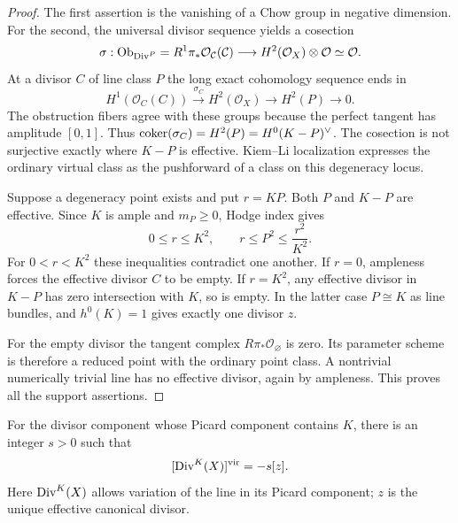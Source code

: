 \begin{proof}
The first assertion is the vanishing of a Chow group in
negative dimension.  For the second, the universal divisor
sequence yields a cosection
\begin{equation}\label{fix:cosection}
 \sigma:\operatorname{Ob}_{\operatorname{Div}^P}
 =R^1\pi_*\mathcal O_{\mathcal C}(\mathcal C)
       \longrightarrow H^2(\mathcal O_X)\otimes\mathcal O
       \simeq\mathcal O.
\end{equation}
At a divisor \(C\) of line class \(P\) the long exact
cohomology sequence ends in
\[
 H^1(\mathcal O_C(C))\xrightarrow{\sigma_C}H^2(\mathcal O_X)
       \longrightarrow H^2(P)\longrightarrow0.
\]
The obstruction fibers agree with these groups because the
perfect tangent has amplitude \([0,1]\).  Thus
\(\operatorname{coker}(\sigma_C)=H^2(P)=H^0(K-P)^\vee\).
The cosection is not surjective exactly where \(K-P\) is
effective.  Kiem--Li localization
\cite[Theorem~1.1]{KiemLi} expresses the ordinary virtual
class as the pushforward of a class on this degeneracy locus.

Suppose a degeneracy point exists and put \(r=KP\).
Both \(P\) and \(K-P\) are effective.  Since \(K\) is ample
and \(m_P\ge0\), Hodge index gives
\[
 0\le r\le K^2,\qquad
 r\le P^2\le\frac{r^2}{K^2}.
\]
For \(0<r<K^2\) these inequalities contradict one another.
If \(r=0\), ampleness forces the effective divisor \(C\)
to be empty.  If \(r=K^2\), any effective divisor in
\(K-P\) has zero intersection with \(K\), so is empty.
In the latter case \(P\cong K\) as line bundles, and
\(h^0(K)=1\) gives exactly one divisor \(z\).

For the empty divisor the tangent complex
\(R\pi_*\mathcal O_\varnothing\) is zero.
Its parameter scheme is therefore a reduced point with
the ordinary point class.  A nontrivial numerically
trivial line has no effective divisor, again by ampleness.
This proves all the support assertions.
\end{proof}

\begin{lemma}\label{fix:canonical-sign}
For the divisor component whose Picard component contains
\(K\), there is an integer \(s>0\) such that
\begin{equation}\label{eq:canonical-cycle}
 [\operatorname{Div}^{K}(X)]^{\mathrm{vir}}=-s[z].
\end{equation}
Here \(\operatorname{Div}^{K}(X)\) allows variation of the line in its
Picard component; \(z\) is the unique effective canonical
divisor.
\end{lemma}

